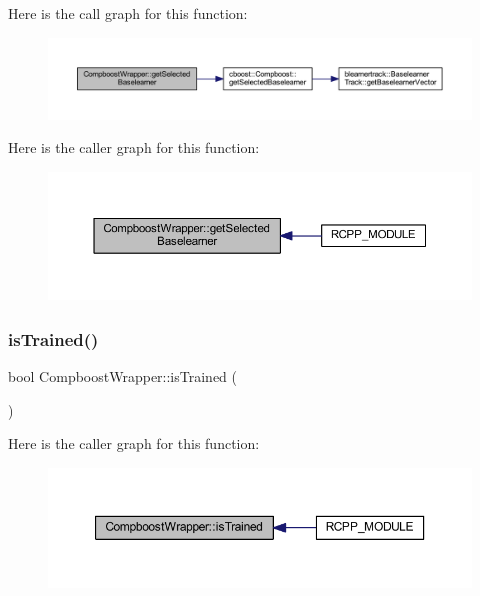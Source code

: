 Here is the call graph for this function\+:\nopagebreak
\begin{figure}[H]
\begin{center}
\leavevmode
\includegraphics[width=350pt]{class_compboost_wrapper_aa5313de3cf62b93286a67f266b605443_cgraph}
\end{center}
\end{figure}
Here is the caller graph for this function\+:\nopagebreak
\begin{figure}[H]
\begin{center}
\leavevmode
\includegraphics[width=350pt]{class_compboost_wrapper_aa5313de3cf62b93286a67f266b605443_icgraph}
\end{center}
\end{figure}
\mbox{\label{class_compboost_wrapper_a0e12eb55444c9333fdc1ee1696483f6d}} 
\subsubsection{\texorpdfstring{is\+Trained()}{isTrained()}}
{\footnotesize\ttfamily bool Compboost\+Wrapper\+::is\+Trained (\begin{DoxyParamCaption}{ }\end{DoxyParamCaption})\hspace{0.3cm}{\ttfamily [inline]}}

Here is the caller graph for this function\+:\nopagebreak
\begin{figure}[H]
\begin{center}
\leavevmode
\includegraphics[width=350pt]{class_compboost_wrapper_a0e12eb55444c9333fdc1ee1696483f6d_icgraph}
\end{center}
\end{figure}
\mbox{\label{class_compboost_wrapper_a62637fbc8c50160b411b817b7e99432e}} 
